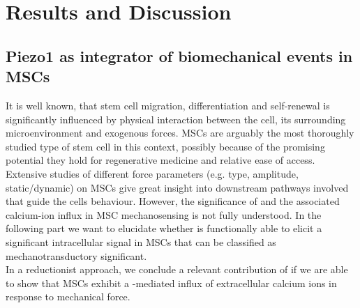 \chapter{Results and Discussion}

\section{Piezo1 as integrator of biomechanical events in MSCs}
\label{sec:piezo1-as-integrator-of-biomechanical-events-in-mscs}

It is well known, that stem cell migration, differentiation and self-renewal is significantly influenced by physical interaction between the cell, its surrounding microenvironment and exogenous forces. \cite{Eyckmans2011, Lee2011} MSCs are arguably the most thoroughly studied type of stem cell in this context, possibly because of the promising potential they hold for regenerative medicine and relative ease of access. Extensive studies of different force parameters (e.g. type, amplitude, static/dynamic) on MSCs give great insight into downstream pathways involved that guide the cells behaviour. However, the significance of \Piezo{} and the associated calcium-ion influx in MSC mechanosensing is not fully understood. In the following part we want to elucidate whether \Piezo{} is functionally able to elicit a significant intracellular signal in MSCs that can be classified as mechanotransductory significant.\\
In a reductionist approach, we conclude a relevant contribution of \Piezo{} if we are able to show that MSCs exhibit a \Piezo{}-mediated influx of extracellular calcium ions in response to mechanical force.\\

